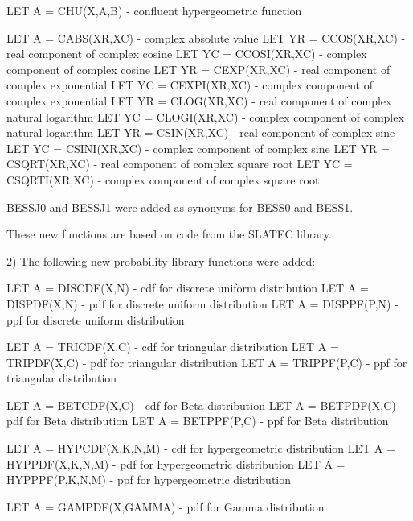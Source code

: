 {       LET A = CHU(X,A,B)          - confluent hypergeometric function

       LET A = CABS(XR,XC)         - complex absolute value
       LET YR = CCOS(XR,XC)        - real component of complex cosine
       LET YC = CCOSI(XR,XC)       - complex component of complex
                                     cosine
       LET YR = CEXP(XR,XC)        - real component of complex
                                     exponential
       LET YC = CEXPI(XR,XC)       - complex component of complex
                                     exponential
       LET YR = CLOG(XR,XC)        - real component of complex
                                     natural logarithm
       LET YC = CLOGI(XR,XC)       - complex component of complex
                                     natural logarithm
       LET YR = CSIN(XR,XC)        - real component of complex sine
       LET YC = CSINI(XR,XC)       - complex component of complex sine
       LET YR = CSQRT(XR,XC)       - real component of complex
                                     square root
       LET YC = CSQRTI(XR,XC)       - complex component of complex
                                     square root

       BESSJ0 and BESSJ1 were added as synonyms for BESS0 and BESS1.

    These new functions are based on code from the SLATEC library.

 2) The following new probability library functions were added:

       LET A = DISCDF(X,N)     - cdf for discrete uniform distribution
       LET A = DISPDF(X,N)     - pdf for discrete uniform distribution
       LET A = DISPPF(P,N)     - ppf for discrete uniform distribution

       LET A = TRICDF(X,C)     - cdf for triangular distribution
       LET A = TRIPDF(X,C)     - pdf for triangular distribution
       LET A = TRIPPF(P,C)     - ppf for triangular distribution

       LET A = BETCDF(X,C)     - cdf for Beta distribution
       LET A = BETPDF(X,C)     - pdf for Beta distribution
       LET A = BETPPF(P,C)     - ppf for Beta distribution

       LET A = HYPCDF(X,K,N,M) - cdf for hypergeometric distribution
       LET A = HYPPDF(X,K,N,M) - pdf for hypergeometric distribution
       LET A = HYPPPF(P,K,N,M) - ppf for hypergeometric distribution

       LET A = GAMPDF(X,GAMMA) - pdf for Gamma distribution

}
